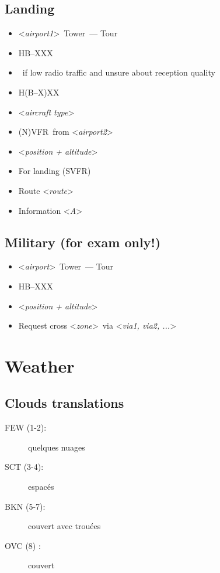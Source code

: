 \documentclass[12pt,twoside,a4paper]{article}
\newcommand*{\Rep}[1]{<\emph{#1}>}
\newcommand*{\Act}[1]{{\color{red}{#1}} }
\newcommand*{\AP}[1][]{\Rep{airport#1}}
\newcommand*{\TWR}{Tower}
\newcommand*{\TOR}{Tour}
\newcommand*{\HB}{HB--XXX}
\newcommand*{\ShortHB}{H(B--X)XX}
\newcommand*{\TYPE}{\Rep{aircraft type}}
\newcommand*{\VFR}{VFR}
\newcommand*{\NVFR}{(N)\VFR}
\newcommand*{\POSDDD}{\Rep{position + altitude}}
\newcommand*{\InfoA}{\Rep{A}}
\newcommand*{\Via}{\Rep{via1, via2, ...}}
\newcommand*{\WAIT}{\Act{.....wait for answer.....}}
\numberwithin{equation}{section}
\numberwithin{figure}{section}
\begin{document}
\subsection{Landing}%
\label{sec:intro:landing}
\begin{itemize}
	\item \AP[1]\ \TWR\ --- \TOR
	\item \HB
	\item \WAIT\ if low radio traffic and unsure about reception quality
	\item \ShortHB
	\item \TYPE
	\item \NVFR\ from \AP[2]
	\item \POSDDD
	\item For landing (S\VFR)
	\item Route \Rep{route}
	\item Information \InfoA
\end{itemize}
\setcounter{subsection}{98}
\subsection{Military (for exam only!)}%
\begin{itemize}
	\item \AP\ \TWR\ --- \TOR
	\item \HB
	\item \POSDDD
	\item Request cross \Rep{zone}\ via \Via
\end{itemize}
\section{Weather}%
\label{sec:weather}
\subsection{Clouds translations}%
\label{sec:weather:clouds}
\begin{description}
	\item[FEW (1-2):] quelques nuages
	\item[SCT (3-4):] espac\'es
	\item[BKN (5-7):] couvert avec trou\'ees
	\item[OVC (8)  :] couvert
\end{description}

\end{document}
